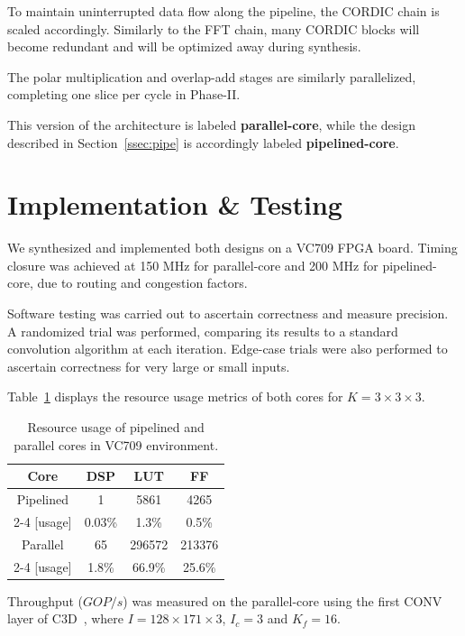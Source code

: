 \documentclass[
  10pt,
  \FORMAT-MODE,
  \REVIEW-MODE,
  \TWOSIDE-MODE
]{IEEEtran}
\let\MYoriglatexcaption\caption
\renewcommand{\caption}[2][\relax]{\MYoriglatexcaption[#2]{#2}}
\begin{document}
    To maintain uninterrupted data flow along the pipeline, the CORDIC chain is scaled accordingly. Similarly to the FFT chain, many CORDIC blocks will become redundant and will be optimized away during synthesis.

    The polar multiplication and overlap-add stages are similarly parallelized, completing one slice per cycle in Phase-II.

    This version of the architecture is labeled \textbf{parallel-core}, while the design described in Section~\ref{ssec:pipe} is accordingly labeled \textbf{pipelined-core}.
    
\section{Implementation \& Testing}\label{sec:imp}
  We synthesized and implemented both designs on a VC709 FPGA board. Timing closure was achieved at 150 MHz for parallel-core and 200 MHz for pipelined-core, due to routing and congestion factors.

  Software testing was carried out to ascertain correctness and measure precision. A randomized trial was performed, comparing its results to a standard convolution algorithm at each iteration. Edge-case trials were also performed to ascertain correctness for very large or small inputs.

  Table~\ref{tab:ru} displays the resource usage metrics of both cores for $K = 3{\times}3{\times}3$. 

  \begin{table}[htb]
    \caption{Resource usage of pipelined and parallel cores in VC709 environment.}
    \centering
    \label{tab:ru}
    \begin{tabular}{|c|c|c|c|}\hline
      Core       & DSP    & LUT    & FF     \\\hline
      Pipelined  & 1      & 5861   & 4265   \\\cline{2-4}
      [usage]    & 0.03\% & 1.3\%  & 0.5\%  \\\hline
      Parallel   & 65     & 296572 & 213376 \\\cline{2-4}
      [usage]    & 1.8\%  & 66.9\% & 25.6\% \\\hline
    \end{tabular}
  \end{table}

  Throughput ($GOP/s$) was measured on the parallel-core using the first CONV layer of C3D~\cite{tran2015learning}, where $I=128{\times}171{\times}3$, $I_c=3$ and $K_f=16$.
\end{document}
